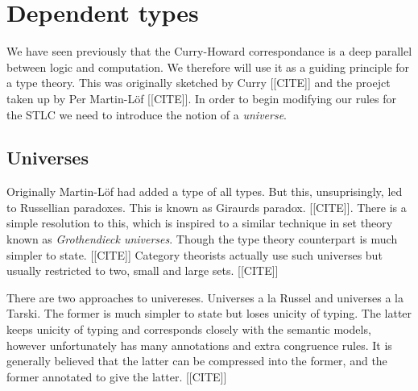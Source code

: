 \section{Dependent types}

We have seen previously that the Curry-Howard correspondance is a deep parallel between logic and computation. We therefore will use it as a guiding principle for a type theory. This was originally sketched by Curry [[CITE]] and the proejct taken up by Per Martin-L\"of [[CITE]]. In order to begin modifying our rules for the STLC we need to introduce the notion of a \emph{universe}.

\subsection{Universes}

Originally Martin-L\"of had added a type of all types. But this, unsuprisingly, led to Russellian paradoxes. This is known as Giraurds paradox. [[CITE]]. There is a simple resolution to this, which is inspired to a similar technique in set theory known as \emph{Grothendieck universes}. Though the type theory counterpart is much simpler to state. [[CITE]] Category theorists actually use such universes but usually restricted to two, small and large sets. [[CITE]]

There are two approaches to univereses. Universes a la Russel and universes a la Tarski. The former is much simpler to state but loses unicity of typing. The latter keeps unicity of typing and corresponds closely with the semantic models, however unfortunately has many annotations and extra congruence rules. It is generally believed that the latter can be compressed into the former, and the former annotated to give the latter. [[CITE]]


